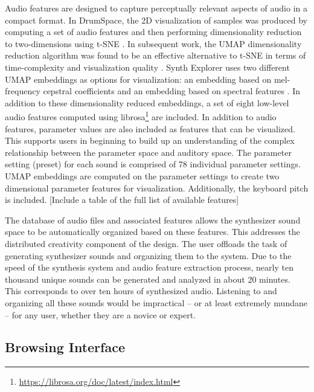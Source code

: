 Audio features are designed to capture perceptually relevant aspects of audio in a compact format. In DrumSpace, the 2D visualization of samples was produced by computing a set of audio features and then performing dimensionality reduction to two-dimensions using t-SNE \cite{turquois2016exploring, van2008visualizing}. In subsequent work, the UMAP dimensionality reduction algorithm \cite{mcinnes2020umap} was found to be an effective alternative to t-SNE in terms of time-complexity and visualization quality \cite{jiale2020visualization}. Synth Explorer uses two different UMAP embeddings as options for visualization: an embedding based on mel-frequency cepstral coefficients and an embedding based on spectral features \cite{peeters2004large}. In addition to these dimensionality reduced embeddings, a set of eight low-level audio features computed using librosa\footnote{\url{https://librosa.org/doc/latest/index.html}} are included. In addition to audio features, parameter values are also included as features that can be visualized. This supports users in beginning to build up an understanding of the complex relationship between the parameter space and auditory space. The parameter setting (preset) for each sound is comprised of 78 individual parameter settings. UMAP embeddings are computed on the parameter settings to create two dimensional parameter features for visualization. Additionally, the keyboard pitch is included.
[Include a table of the full list of available features]

The database of audio files and associated features allows the synthesizer sound space to be automatically organized based on these features. This addresses the distributed creativity component of the design. The user offloads the task of generating synthesizer sounds and organizing them to the system. Due to the speed of the synthesis system and audio feature extraction process, nearly ten thousand unique sounds can be generated and analyzed in about 20 minutes. This corresponds to over ten hours of synthesized audio. Listening to and organizing all these sounds would be impractical -- or at least extremely mundane -- for any user, whether they are a novice or expert. 

\subsection{Browsing Interface}

